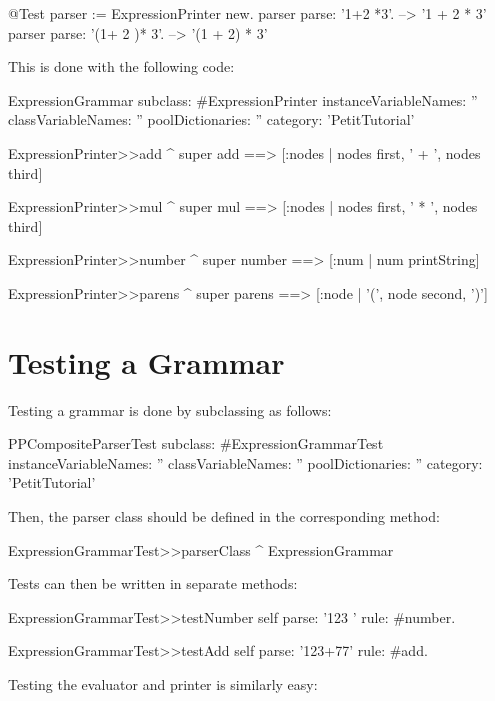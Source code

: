 \documentclass[a4paper,10pt,twoside]{book}
\begin{document}
\begin{code}{@Test}
parser := ExpressionPrinter new.
parser parse: '1+2 *3'.          --> '1 + 2 * 3'
parser parse: '(1+ 2 )* 3'.      --> '(1 + 2) * 3'
\end{code}

This is done with the following code:

\begin{code}{}
ExpressionGrammar subclass: #ExpressionPrinter
  instanceVariableNames: ''
  classVariableNames: ''
  poolDictionaries: ''
  category: 'PetitTutorial'

ExpressionPrinter>>add
  ^ super add ==> [:nodes | nodes first, ' + ', nodes third]

ExpressionPrinter>>mul
  ^ super mul ==> [:nodes | nodes first, ' * ', nodes third]

ExpressionPrinter>>number
  ^ super number ==> [:num | num printString]

ExpressionPrinter>>parens
  ^ super parens ==> [:node | '(', node second, ')']
\end{code}

\section{Testing a Grammar}

Testing a grammar is done by subclassing  as
follows:

\begin{code}{}
PPCompositeParserTest subclass: #ExpressionGrammarTest
  instanceVariableNames: ''
  classVariableNames: ''
  poolDictionaries: ''
  category: 'PetitTutorial'
\end{code}

Then, the parser class should be defined in the corresponding method:

\begin{code}{}
ExpressionGrammarTest>>parserClass
  ^ ExpressionGrammar
\end{code}

Tests can then be written in separate methods:

\begin{code}{}
ExpressionGrammarTest>>testNumber
  self parse: '123 ' rule: #number.

ExpressionGrammarTest>>testAdd
  self parse: '123+77' rule: #add.
\end{code}

Testing the evaluator and printer is similarly easy:
\end{document}
